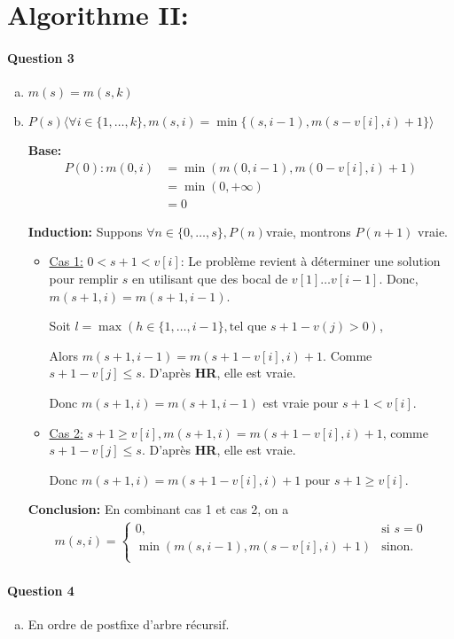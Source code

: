\documentclass{article}
\begin{document}
\section{Algorithme II:}
\paragraph{Question 3}
\begin{enumerate}[a)]
\item $m(s) = m(s,k)$
\item $P(s)  \langle \forall i \in \{1,\dots,k\}, m(s,i)=\min\{(s,i-1), m(s-v[i],i) + 1\} \rangle$

\textbf{Base: }
\begin{align*}
P(0): m(0,i) &= \min(m(0,i-1), m(0-v[i], i)+1)\\&=\min(0, +\infty)\\&=0
\end{align*}

\textbf{Induction: }Suppons $\forall n \in \{0,\dots,s\}, P(n) $vraie, montrons $P(n+1)$ vraie.
\begin{itemize}
\item \underline{Cas 1:} $0<s+1<v[i]$: Le problème revient à déterminer une solution pour remplir $s$ en utilisant que des bocal de $v[1] \dots v[i-1]$. Donc, $m(s+1, i)= m(s+1, i-1)$.

Soit $l = \max (h \in \{1,\dots,i-1\}, \text{tel que }s+1-v(j)>0)$,

Alors $m(s+1, i-1)= m(s+1-v[i], i) + 1$. Comme $s+1-v[j] \leq s$. D'après \textbf{HR}, elle est vraie.

Donc $m(s+1,i)= m(s+1, i-1) $ est vraie pour $s+1 < v[i]$.
\item \underline{Cas 2:} $s+1 \geq v[i], m(s+1,i)= m(s+1-v[i], i) + 1$, comme $s+1-v[j] \leq s$. D'après \textbf{HR}, elle est vraie.

Donc $m(s+1,i)= m(s+1-v[i], i) + 1$ pour $s+1 \geq v[i]$. 
\end{itemize}
\textbf{Conclusion: } En combinant cas 1 et cas 2, on a 
\begin{align*}
 m(s,i)=
\begin{cases}
0,&\text{si } s=0\\
\min(m(s,i-1),m(s-v[i],i)+1)&\text{sinon.} \\
\end{cases}
\end{align*} 
\end{enumerate}
\paragraph{Question 4}
\begin{enumerate}[a)]
\item En ordre de postfixe d'arbre récursif.
\end{enumerate}
\end{document}
